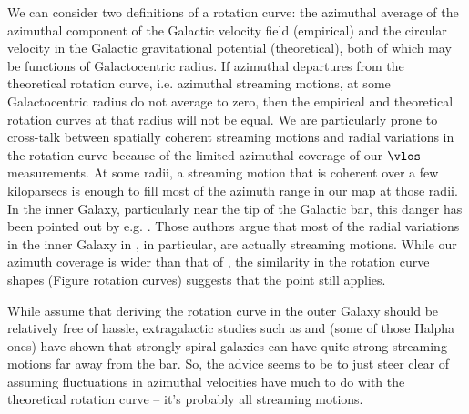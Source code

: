 We can consider two definitions of a rotation curve: the azimuthal average of the azimuthal component of the Galactic velocity field (empirical) and the circular velocity in the Galactic gravitational potential (theoretical), both of which may be functions of Galactocentric radius. 
If azimuthal departures from the theoretical rotation curve, i.e. azimuthal streaming motions, at some Galactocentric radius do not average to zero, then the empirical and theoretical rotation curves at that radius will not be equal. 
We are particularly prone to cross-talk between spatially coherent streaming motions and radial variations in the rotation curve because of the limited azimuthal coverage of our $\vlos$ measurements.
At some radii, a streaming motion that is coherent over a few kiloparsecs is enough to fill most of the azimuth range in our map at those radii. 
In the inner Galaxy, particularly near the tip of the Galactic bar, this danger has been pointed out by e.g. \citet{Chemin_2015}.
Those authors argue that most of the radial variations in the inner Galaxy in \Clemens, in particular, are actually streaming motions.
While our azimuth coverage is wider than that of \Clemens, the similarity in the rotation curve shapes (Figure rotation curves) suggests that the point still applies.

While \citet{Chemin_2015} assume that deriving the rotation curve in the outer Galaxy should be relatively free of hassle, extragalactic studies such as \citet{Meidt_2013} and (some of those Halpha ones) have shown that strongly spiral galaxies can have quite strong streaming motions far away from the bar. 
So, the advice seems to be to just steer clear of assuming fluctuations in azimuthal velocities have much to do with the theoretical rotation curve -- it's probably all streaming motions. 